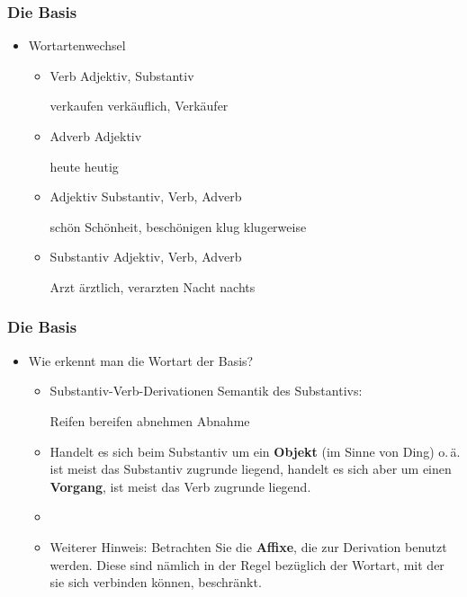\begin{frame}
\frametitle{Die Basis}

\begin{itemize}
	\item Wortartenwechsel
	
	\begin{itemize}
		\item Verb \ras Adjektiv, Substantiv
		
		\ea verkaufen \ras verkäuflich, Verkäufer
		\z
		
		\item Adverb \ras Adjektiv
		
		\ea heute \ras heutig
		\z
		
		\item Adjektiv \ras Substantiv, Verb, Adverb
		
		\eal 
			\ex schön \ras Schönheit, beschönigen
			\ex klug \ras klugerweise
		\zl
		
		\item Substantiv \ras Adjektiv, Verb, Adverb

		\eal 
			\ex Arzt \ras ärztlich, verarzten
			\ex Nacht \ras nachts
		\zl
		
	\end{itemize}
	
\end{itemize}


\end{frame}




\begin{frame}
\frametitle{Die Basis}

\begin{itemize}
	\item Wie erkennt man die Wortart der Basis?
	
	\begin{itemize}
		\item Substantiv-Verb-Derivationen \ras Semantik des Substantivs:
		
		\eal 
			\ex Reifen \ras bereifen
			\ex abnehmen \ras Abnahme
		\zl
		
		\item Handelt es sich beim Substantiv um ein \textbf{Objekt} (im Sinne von Ding) o.\,ä. ist meist das Substantiv zugrunde liegend, handelt es sich aber um einen \textbf{Vorgang}, ist meist das Verb zugrunde liegend.
		\item[]
		\item Weiterer Hinweis: Betrachten Sie die \textbf{Affixe}, die zur Derivation benutzt werden. Diese sind nämlich in der Regel bezüglich der Wortart, mit der sie sich verbinden können, beschränkt.
		
	\end{itemize}
	
\end{itemize}


\end{frame}



